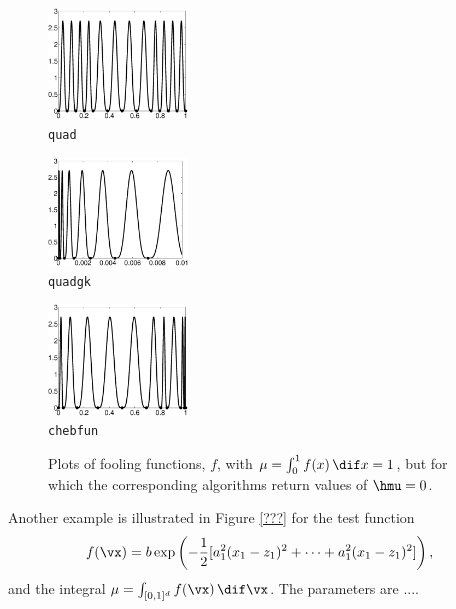 \documentclass[graybox]{svmult}
\begin{document}
\begin{figure}
\centering
\begin{minipage}{3.7cm} \centering \includegraphics[width=3.7cm]{Foolquadbw.eps} \\ {\tt quad} \end{minipage}
\begin{minipage}{3.7cm} \centering \includegraphics[width=3.7cm]{Foolquadgkbw.eps} \\ {\tt quadgk} \end{minipage}
\begin{minipage}{3.7cm} \centering \includegraphics[width=3.7cm]{Foolchebintbw.eps} \\ {\tt chebfun} \end{minipage}
\caption{Plots of fooling functions, $f$, with $\mu=\int_0^1 f(x) \, \dif x=1$, but for which the corresponding algorithms return values of $\hmu=0$. \label{foolfunfig}}
\end{figure}

Another example is illustrated in Figure \ref{???} for the test function
\[
f(\vx) = b \exp\left(-\frac 12 [a_1^2(x_1-z_1)^2 + \cdots + a_1^2(x_1-z_1)^2]\right),
\]
and the integral $\mu=\int_{[0,1]^d} f(\vx) \, \dif \vx$.  The parameters are ....
\end{document}
